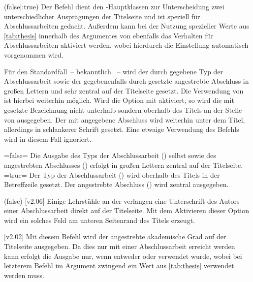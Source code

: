 \begin{DeclareEntity*}{}
\begin{DeclareEntity*}{}
\begin{DeclareEntity*}{}
\begin{Declaration}
  {}
  (false|:true)
\printdeclarationlist
%
Der Befehl  dient den \TUDScript-Hauptklassen zur Unterscheidung 
zwei unterschiedlicher Ausprägungen der Titelseite und ist speziell für 
Abschlussarbeiten gedacht. Außerdem kann bei der Nutzung spezieller Werte 
aus \autoref{tab:thesis} innerhalb des Argumentes von  ebenfalls 
das Verhalten für Abschlussarbeiten aktiviert werden, wobei hierdurch die 
Einstellung  automatisch vorgenommen wird.

Für den Standardfall~-- bekanntlich ~-- wird der 
durch  gegebene Typ der Abschlussarbeit sowie der gegebenenfalls 
durch  gesetzte angestrebte Abschluss in großen Lettern und 
sehr zentral auf der Titelseite gesetzt. Die Verwendung von  ist 
hierbei weiterhin möglich.
%
Wird die Option mit  aktiviert, so wird die mit 
 gesetzte Bezeichnung nicht unterhalb sondern oberhalb des Titels 
an der Stelle von  ausgegeben. Der mit  
angegebene Abschluss wird weiterhin unter dem Titel, allerdings in schlankerer 
Schrift gesetzt. Eine etwaige Verwendung des Befehls  wird in 
diesem Fall ignoriert.
\begin{DeclareValues}
\itemval=false=
  Die Ausgabe des Typs der Abschlussarbeit () selbst sowie des 
  angestrebten Abschlusses () erfolgt in großen Lettern 
  zentral auf der Titelseite.
\itemval*=true=
  Der Typ der Abschlussarbeit () wird oberhalb des Titels in der 
  Betreffzeile gesetzt. Der angestrebte Abschluss () wird 
  zentral ausgegeben.
\end{DeclareValues}
\end{Declaration}

\begin{Declaration}
  {}
  (false)
  [v2.06]
\printdeclarationlist
%
Einige Lehrstühle an der \TnUD verlangen eine Unterschrift des Autors einer 
Abschlussarbeit direkt auf der Titelseite. Mit dem Aktivieren dieser Option 
wird ein solches Feld am unteren Seitenrand des Titels erzeugt.
\end{Declaration}

\begin{Declaration}
  {}
  [v2.02]
\printdeclarationlist
%
Mit diesem Befehl wird der angestrebte akademische Grad auf der Titelseite 
ausgegeben. Da dies nur mit einer Abschlussarbeit erreicht werden kann erfolgt 
die Ausgabe nur, wenn entweder  oder  verwendet 
wurde, wobei bei letzterem Befehl im Argument zwingend ein Wert aus 
\autoref{tab:thesis} verwendet werden muss.


\end{Declaration}
\end{DeclareEntity*}
\end{DeclareEntity*}
\end{DeclareEntity*}
